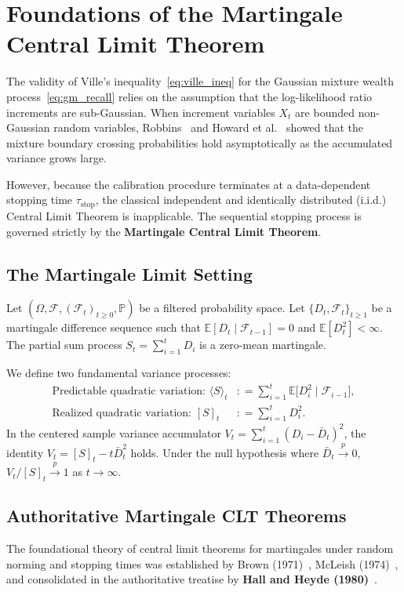\documentclass[11pt,a4paper]{article}
\newcommand{\coloneqq}{\mathrel{\mathop:}=}
\begin{document}
\newpage
\section{Foundations of the Martingale Central Limit Theorem}

The validity of Ville's inequality~\eqref{eq:ville_ineq} for the Gaussian mixture wealth process~\eqref{eq:gm_recall} relies on the assumption that the log-likelihood ratio increments are sub-Gaussian. When increment variables $X_t$ are bounded non-Gaussian random variables, Robbins~\cite{robbins1970} and Howard et al.~\cite{howard2021} showed that the mixture boundary crossing probabilities hold asymptotically as the accumulated variance grows large. 

However, because the calibration procedure terminates at a data-dependent stopping time $\tau_{\text{stop}}$, the classical independent and identically distributed (i.i.d.) Central Limit Theorem is inapplicable. The sequential stopping process is governed strictly by the \textbf{Martingale Central Limit Theorem}.

\subsection{The Martingale Limit Setting}
Let $(\Omega, \mathcal{F}, (\mathcal{F}_t)_{t \ge 0}, \mathbb{P})$ be a filtered probability space. Let $\{D_t, \mathcal{F}_t\}_{t \ge 1}$ be a martingale difference sequence such that $\mathbb{E}[D_t \mid \mathcal{F}_{t-1}] = 0$ and $\mathbb{E}[D_t^2] < \infty$. The partial sum process $S_t = \sum_{i=1}^t D_i$ is a zero-mean martingale.

We define two fundamental variance processes:
\begin{align}
\text{Predictable quadratic variation: } \langle S \rangle_t &\coloneqq \sum_{i=1}^t \mathbb{E}\big[ D_i^2 \;\big|\; \mathcal{F}_{i-1} \big], \label{eq:angle_bracket} \\
\text{Realized quadratic variation: } [S]_t &\coloneqq \sum_{i=1}^t D_i^2. \label{eq:square_bracket}
\end{align}
In the centered sample variance accumulator $V_t = \sum_{i=1}^t (D_i - \bar{D}_t)^2$, the identity $V_t = [S]_t - t \bar{D}_t^2$ holds. Under the null hypothesis where $\bar{D}_t \xrightarrow{p} 0$, $V_t / [S]_t \xrightarrow{p} 1$ as $t \to \infty$.

\subsection{Authoritative Martingale CLT Theorems}
The foundational theory of central limit theorems for martingales under random norming and stopping times was established by Brown (1971)~\cite{brown1971}, McLeish (1974)~\cite{mcleish1974}, and consolidated in the authoritative treatise by \textbf{Hall and Heyde (1980)}~\cite{hall1980martingale}.
\end{document}
